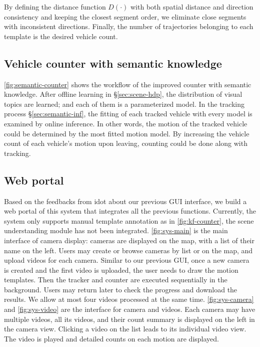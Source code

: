 By defining the distance function $D(\cdot)$ with both spatial distance and direction consistency and keeping the closest segment order, we eliminate close segments with inconsistent directions. 
Finally, the number of trajectories belonging to each template is the desired vehicle count.

\subsection{Vehicle counter with semantic knowledge}
\ref{fig:semantic-counter} shows the workflow of the improved counter with semantic knowledge. 
After offline learning in \S\ref{sec:scene-hdp}, the distribution of visual topics are learned; and each of them is a parameterized model.
In the tracking process \S\ref{sec:semantic-inf}, the fitting of each tracked vehicle with every model is examined by online inference.
In other words, the motion of the tracked vehicle could be determined by the most fitted motion model. 
By increasing the vehicle count of each vehicle's motion upon leaving, counting could be done along with tracking. 



\subsection{Web portal}
Based on the feedbacks from \gls{idot} about our previous GUI interface, we build a web portal of this system that integrates all the previous functions.
Currently, the system only supports manual template annotation as in \ref{fig:kf-counter}, the scene understanding module has not been integrated.
\ref{fig:sys-main} is the main interface of camera display: cameras are displayed on the map, with a list of their name on the left. 
Users may create or browse cameras by list or on the map, and upload videos for each camera. 
Similar to our previous GUI, once a new camera is created and the first video is uploaded, the user needs to draw the motion templates.
Then the tracker and counter are executed sequentially in the background. 
Users may return later to check the progress and download the results. We allow at most four videos processed at the same time. 
\ref{fig:sys-camera} and \ref{fig:sys-video} are the interface for camera and videos. 
Each camera may have multiple videos, all its videos, and their count summary is displayed on the left in the camera view. 
Clicking a video on the list leads to its individual video view. The video is played and detailed counts on each motion are displayed.


